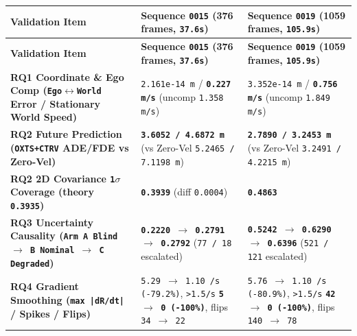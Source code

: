 \documentclass[10.5pt,a4paper]{article}
\begin{document}
\begin{footnotesize}
\setlength{\tabcolsep}{4pt}
\setlength{\LTleft}{0pt}\setlength{\LTright}{0pt}
\begin{longtable}{>{\raggedright\arraybackslash}p{} >{\raggedright\arraybackslash}p{} >{\raggedright\arraybackslash}p{}}
\toprule
\textbf{Validation Item} & \textbf{Sequence \texttt{0015} (376 frames, \texttt{37.\allowbreak{}6s})} & \textbf{Sequence \texttt{0019} (1059 frames, \texttt{105.\allowbreak{}9s})} \\
\midrule
\endfirsthead
\toprule
\textbf{Validation Item} & \textbf{Sequence \texttt{0015} (376 frames, \texttt{37.\allowbreak{}6s})} & \textbf{Sequence \texttt{0019} (1059 frames, \texttt{105.\allowbreak{}9s})} \\
\midrule
\endhead
\bottomrule
\endfoot
\textbf{RQ1 Coordinate \& Ego Comp (\texttt{Ego$\leftrightarrow$World} Error / Stationary World Speed)} & \texttt{2.\allowbreak{}161e-\allowbreak{}14 m} / \textbf{\texttt{0.\allowbreak{}227 m/\allowbreak{}s}} (uncomp \texttt{1.\allowbreak{}358 m/\allowbreak{}s}) & \texttt{3.\allowbreak{}352e-\allowbreak{}14 m} / \textbf{\texttt{0.\allowbreak{}756 m/\allowbreak{}s}} (uncomp \texttt{1.\allowbreak{}849 m/\allowbreak{}s}) \\
\textbf{RQ2 Future Prediction (\texttt{OXTS+CTRV} ADE/FDE vs Zero-Vel)} & \textbf{\texttt{3.\allowbreak{}6052 /\allowbreak{} 4.\allowbreak{}6872 m}} (vs Zero-Vel \texttt{5.\allowbreak{}2465 /\allowbreak{} 7.\allowbreak{}1198 m}) & \textbf{\texttt{2.\allowbreak{}7890 /\allowbreak{} 3.\allowbreak{}2453 m}} (vs Zero-Vel \texttt{3.\allowbreak{}2491 /\allowbreak{} 4.\allowbreak{}2215 m}) \\
\textbf{RQ2 2D Covariance \texttt{1$\sigma$} Coverage (theory \texttt{0.\allowbreak{}3935})} & \textbf{\texttt{0.\allowbreak{}3939}} (diff \texttt{0.\allowbreak{}0004}) & \textbf{\texttt{0.\allowbreak{}4863}} \\
\textbf{RQ3 Uncertainty Causality (\texttt{Arm A Blind $\rightarrow$ B Nominal $\rightarrow$ C Degraded})} & \textbf{\texttt{0.\allowbreak{}2220 $\rightarrow$ 0.\allowbreak{}2791 $\rightarrow$ 0.\allowbreak{}2792}} (\texttt{77 /\allowbreak{} 18} escalated) & \textbf{\texttt{0.\allowbreak{}5242 $\rightarrow$ 0.\allowbreak{}6290 $\rightarrow$ 0.\allowbreak{}6396}} (\texttt{521 /\allowbreak{} 121} escalated) \\
\textbf{RQ4 Gradient Smoothing (\texttt{max |dR/\allowbreak{}dt|} / Spikes / Flips)} & \texttt{5.\allowbreak{}29 $\rightarrow$ 1.\allowbreak{}10 /\allowbreak{}s (-\allowbreak{}79.\allowbreak{}2\%)}, \texttt{>1.\allowbreak{}5/\allowbreak{}s} \textbf{\texttt{5 $\rightarrow$ 0 (-\allowbreak{}100\%)}}, flips \texttt{34 $\rightarrow$ 22} & \texttt{5.\allowbreak{}76 $\rightarrow$ 1.\allowbreak{}10 /\allowbreak{}s (-\allowbreak{}80.\allowbreak{}9\%)}, \texttt{>1.\allowbreak{}5/\allowbreak{}s} \textbf{\texttt{42 $\rightarrow$ 0 (-\allowbreak{}100\%)}}, flips \texttt{140 $\rightarrow$ 78} \\

\end{longtable}
\end{footnotesize}
\end{document}
